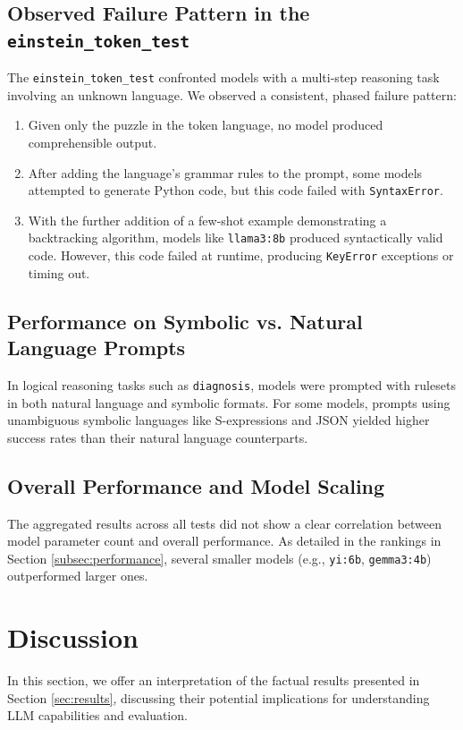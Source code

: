 \documentclass[11pt]{article}
\begin{document}
\subsection{Observed Failure Pattern in the \texttt{einstein\_token\_test}}
The \texttt{einstein\_token\_test} confronted models with a multi-step reasoning task involving an unknown language. We observed a consistent, phased failure pattern:
\begin{enumerate}
    \item Given only the puzzle in the token language, no model produced comprehensible output.
    \item After adding the language's grammar rules to the prompt, some models attempted to generate Python code, but this code failed with \texttt{SyntaxError}.
    \item With the further addition of a few-shot example demonstrating a backtracking algorithm, models like \texttt{llama3:8b} produced syntactically valid code. However, this code failed at runtime, producing \texttt{KeyError} exceptions or timing out.
\end{enumerate}

\subsection{Performance on Symbolic vs. Natural Language Prompts}
In logical reasoning tasks such as \texttt{diagnosis}, models were prompted with rulesets in both natural language and symbolic formats. For some models, prompts using unambiguous symbolic languages like S-expressions and JSON yielded higher success rates than their natural language counterparts.

\subsection{Overall Performance and Model Scaling}
The aggregated results across all tests did not show a clear correlation between model parameter count and overall performance. As detailed in the rankings in Section \ref{subsec:performance}, several smaller models (e.g., \texttt{yi:6b}, \texttt{gemma3:4b}) outperformed larger ones.

\section{Discussion}
\label{sec:discussion}
In this section, we offer an interpretation of the factual results presented in Section \ref{sec:results}, discussing their potential implications for understanding LLM capabilities and evaluation.
\end{document}
